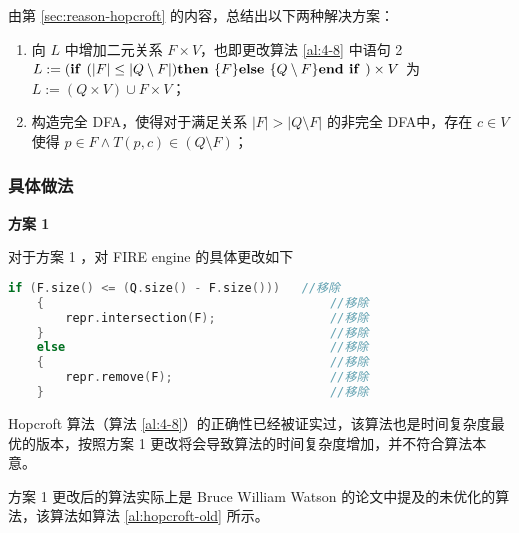 由第 \ref{sec:reason-hopcroft} 的内容，总结出以下两种解决方案：

\begin{enumerate}[(1)~]
    \item 向 $L$ 中增加二元关系 $F\times V$，也即更改算法 \ref{al:4-8} 中语句 2 $L:= ( \mbox{\textbf{if }} ( |F| \leq |Q \setminus F | ) \mbox{\textbf{then }} \{F\} \mbox{\textbf{else }} \{ Q \setminus F \} \mbox{\textbf{end if }} ) \times V $ 为 $ L:= (Q\times V) \cup F\times V $；
    \item 构造完全 DFA，使得对于满足关系 $|F| > |Q \setminus F|$ 的非完全 DFA中，存在 $ c \in V $ 使得 $ p \in F \land T(p,c) \in (Q\setminus F) $；
\end{enumerate}

\subsubsection{具体做法}

{\bfseries 方案 1}

对于方案 1 ，对 FIRE engine 的具体更改如下

\begin{lstlisting}[language=C++,label={lst:min-hop},caption={min-hop.cpp}]
    if (F.size() <= (Q.size() - F.size()))   //移除
	{                                        //移除
		repr.intersection(F);                //移除
	}                                        //移除
	else                                     //移除
	{                                        //移除
		repr.remove(F);                      //移除
	}                                        //移除
\end{lstlisting}

Hopcroft 算法（算法 \ref{al:4-8}）的正确性已经被证实过\cite{Hopc71,HUFFMAN1954161,yingjie2009describing}，该算法也是时间复杂度最优的版本，按照方案 1 更改将会导致算法的时间复杂度增加，并不符合算法本意。

方案 1 更改后的算法实际上是 Bruce William Watson 的论文中提及的未优化的算法，该算法如算法 \ref{al:hopcroft-old} 所示。

